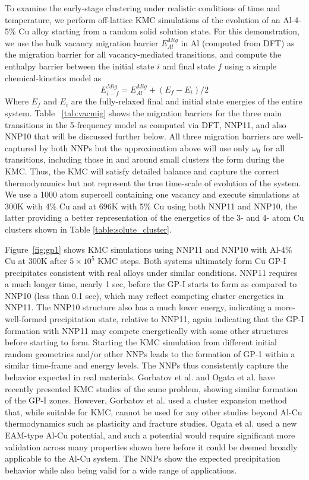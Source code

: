 \documentclass{article}
\begin{document}
To examine the early-stage clustering under realistic conditions of time and temperature, we perform off-lattice KMC simulations of the evolution of an Al-4-5\% Cu alloy starting from a random solid solution state.  For this demonstration, we use the bulk vacancy migration barrier $E^{Mig}_{Al}$ in Al (computed from DFT) as the migration barrier for all vacancy-mediated transitions, and compute the enthalpy barrier between the initial state $i$ and final state $f$ using a simple chemical-kinetics model as
\begin{equation}
E^{Mig}_{i-f}= E^{Mig}_{Al} + (E_{f} - E_{i})/2
\end{equation}
Where $E_{f}$ and $E_{i}$ are the fully-relaxed final and initial state energies of the entire system.  Table ~\ref{tab:vacmig} shows the migration barriers for the three main transitions in the 5-frequency model as computed via DFT\cite{Mantina2009FirstCoefficients}, NNP11, and also NNP10 that will be discussed further below.  All three migration barriers are well-captured by both NNPs but the approximation above will use only $\omega_0$ for all transitions, including those in and around small clusters the form during the KMC.  Thus, the KMC will satisfy detailed balance and capture the correct thermodynamics but not represent the true time-scale of evolution\cite{Mantina2009FirstCoefficients} of the system. We use a 1000 atom supercell containing one vacancy and execute simulations at 300K with 4\% Cu and at 696K with 5\% Cu using both NNP11 and NNP10, the latter providing a better representation of the energetics of the 3- and 4- atom Cu clusters shown in Table \ref{table:solute_cluster}.

Figure~\ref{fig:gp1} shows KMC simulations using NNP11 and NNP10 with Al-4\% Cu at 300K after $5\times10^{5}$ KMC steps.  Both systems ultimately form Cu GP-I precipitates consistent with real alloys under similar conditions. NNP11 requires a much longer time, nearly 1 sec, before the GP-I starts to form as compared to NNP10 (less than 0.1 sec), which may reflect competing cluster energetics in NNP11. The NNP10 structure also has a much lower energy, indicating a more-well-formed precipitation state, relative to NNP11, again indicating that the GP-I formation with NNP11 may compete energetically with some other structures before starting to form. Starting the KMC simulation from different initial random geometries and/or other NNPs leads to the formation of GP-1 within a similar time-frame and energy levels. The NNPs thus consistently capture the behavior expected in real materials.  Gorbatov et al. and Ogata et al. have recently presented KMC studies of the same problem, showing similar formation of the GP-I zones.  However, Gorbatov et al. used a cluster expansion method that, while suitable for KMC, cannot be used for any other studies beyond Al-Cu thermodynamics such as plasticity and fracture studies.  Ogata et al. used a new EAM-type Al-Cu potential, and such a potential would require significant more validation across many properties shown here before it could be deemed broadly applicable to the Al-Cu system.  The NNPs show the expected precipitation behavior while also being valid for a wide range of applications.
\end{document}
